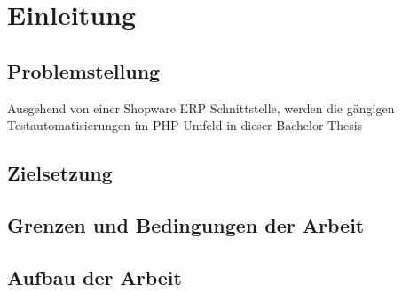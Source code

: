 \section{Einleitung}
\subsection{Problemstellung}
Ausgehend von einer Shopware ERP Schnittstelle, werden die gängigen Testautomatisierungen im PHP Umfeld in dieser Bachelor-Thesis	 	


\subsection{Zielsetzung}

\subsection{Grenzen und Bedingungen der Arbeit}

\subsection{Aufbau der Arbeit}
